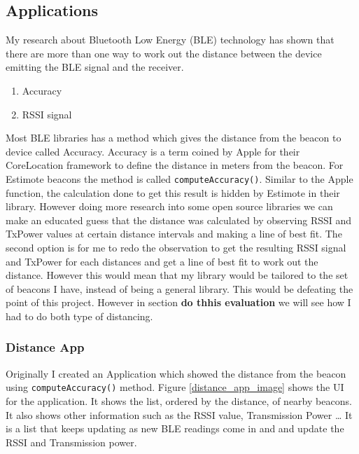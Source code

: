 \subsection{Applications}
My research about Bluetooth Low Energy (BLE) technology has shown that there are more than one way to work out the distance between the device emitting the BLE signal and the receiver. 
\begin{enumerate}
\item Accuracy
\item RSSI signal
\end{enumerate}
Most BLE libraries has a method which gives the distance from the beacon to device called Accuracy. Accuracy is a term coined by Apple for their CoreLocation framework to define the distance in meters from the beacon. For Estimote beacons the method is called  \lstinline|computeAccuracy()|. Similar to the Apple function, the calculation done to get this result is hidden by Estimote in their library. However doing more research into some open source libraries \cite{radius-ranging, android_ibeacon_alt} we can make an educated guess that the distance was calculated by observing RSSI and TxPower values at certain distance intervals and making a line of best fit.
The second option is for me to redo the observation to get the resulting RSSI signal and TxPower for each distances and get a line of best fit to work out the distance. However this would mean that my library would be tailored to the set of beacons I have, instead of being a general library. This would be defeating the point of this project. However in section \textbf{do thhis evaluation} we will see how I had to do both type of distancing.

\subsubsection{Distance App} \label{nocamera_distanceapp}
Originally I created an Application which showed the distance from the beacon using \lstinline|computeAccuracy()| method. Figure \ref{distance_app_image} shows the UI for the application. It shows the list, ordered by the distance, of nearby beacons. It also shows other information such as the RSSI value, Transmission Power \ldots
It is a list that keeps updating as new BLE readings come in and and update the RSSI and Transmission power.

